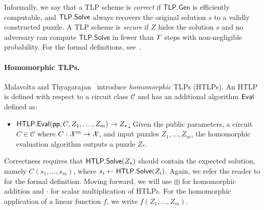 Informally, we say that a TLP scheme is \emph{correct} if $\mathsf{TLP.Gen}$ is efficiently computable, and $\mathsf{TLP}.{\sf Solve}$ always recovers the original solution $s$ to a validly constructed puzzle. A TLP scheme is \emph{secure} if $Z$ hides the solution $s$ and no adversary can compute $\mathsf{TLP.Solve}$ in fewer than $T$ steps with non-negligible probability. For the formal definitions, see~\cite{C:MalThy19}.

\paragraph{Homomorphic TLPs.}
Malavolta and Thyagarajan~\cite{C:MalThy19} introduce \emph{homomorphic} TLPs (HTLPs). An HTLP is defined with respect to a circuit class $\mathcal{C}$ and has an additional algorithm $\sf Eval$ defined as:
\begin{itemize}
    \item \underline{$\mathsf{HTLP}.{\sf Eval}(\mathsf{pp}, C, Z_1, \dots, Z_m) \rightarrow Z_*$:} Given the public parameters, a circuit $C \in \mathcal{C}$ where $C: \mathcal{X}^m \rightarrow \mathcal{X}$, and input puzzles $Z_1, \dots, Z_m$, the homomorphic evaluation algorithm outputs a puzzle $Z_*$.
\end{itemize}

Correctness requires that $\mathsf{HTLP}.{\sf Solve}(Z_*)$
should contain the expected solution, namely $C(s_1, \dots, s_m)$, where $s_i \gets \mathsf{HTLP}.{\sf Solve}(Z_i)$. Again, we refer the reader to \cite{C:MalThy19} for the formal definition. Moving forward, we will use $\boxplus$ for homomorphic addition and $\cdot$ for scalar multiplication of HTLPs. For the homomorphic application of a linear function $f$, we write $f(Z_1, \dots, Z_m)$.


